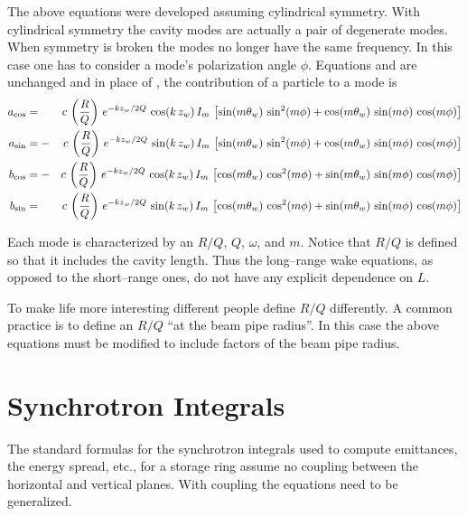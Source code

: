 The above equations were developed assuming cylindrical symmetry. With
cylindrical symmetry the cavity modes are actually a pair of
degenerate modes. When symmetry is broken the modes no longer have the
same frequency. In this case one has to consider a mode's polarization
angle $\phi$. Equations  and  are unchanged and
in place of , the contribution of a particle to a mode is
\begin{alignat}{2}
  a_{\cos} &=  &c \, \left( \frac{R}{Q} \right) \,
    e^{-k z_w/ 2 Q} \, \cos (k \, z_w) \, I_m \, \left[ 
    \sin(m \theta_w) \, \sin^2(m \phi) + 
    \cos(m \theta_w) \, \sin(m \phi) \, \cos(m\phi) \right]
    \nonumber \\
  a_{\sin} &= -&c \, \left( \frac{R}{Q} \right) \,
    e^{-k z_w/ 2 Q} \, \sin (k \, z_w) \, I_m \, \left[
    \sin(m \theta_w) \, \sin^2(m \phi) + 
    \cos(m \theta_w) \, \sin(m \phi) \, \cos(m\phi) \right]
    \\
  b_{\cos} &= -&c \, \left( \frac{R}{Q} \right) \,
    e^{-k z_w/ 2 Q} \, \cos (k \, z_w) \, I_m \, \left[
    \cos(m \theta_w) \, \cos^2(m \phi) + 
    \sin(m \theta_w) \, \sin(m \phi) \, \cos(m\phi) \right]
    \nonumber \\
  b_{\sin} &=  &c \, \left( \frac{R}{Q} \right) \,
    e^{-k z_w/ 2 Q} \, \sin (k \, z_w) \, I_m \, \left[
    \cos(m \theta_w) \, \cos^2(m \phi) + 
    \sin(m \theta_w) \, \sin(m \phi) \, \cos(m\phi) \right]
    \nonumber
\end{alignat}

Each mode is characterized by an $R/Q$, $Q$, $\omega$, and $m$. Notice
that $R/Q$ is defined so that it includes the cavity length. Thus the
long--range wake equations, as opposed to the short--range ones, do
not have any explicit dependence on $L$. 

To make life more interesting different people define $R/Q$
differently. A common practice is to define an $R/Q$ ``at the beam
pipe radius''. In this case the above equations must be modified to
include factors of the beam pipe radius.




\section{Synchrotron Integrals}
\label{s:synch_ints}

The standard formulas for the synchrotron integrals used to compute
emittances, the energy spread, etc., for a storage ring assume no
coupling between the horizontal and vertical
planes\cite{b:helm,b:jowett}.  With coupling the equations need to be
generalized.

